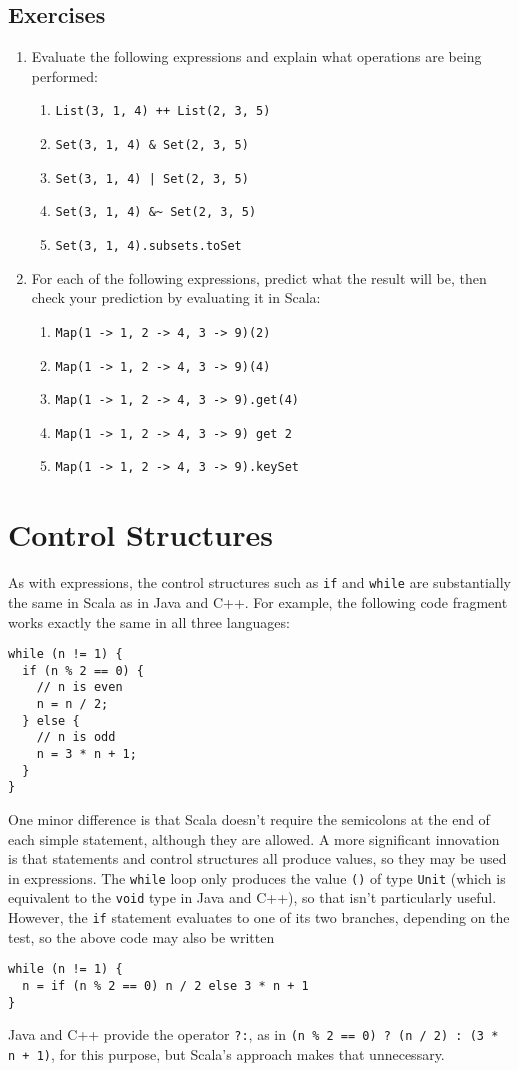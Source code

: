\documentclass[11pt]{article}
\begin{document}
\subsection*{Exercises}
\begin{enumerate}
\item Evaluate the following expressions and explain what operations are being performed:
\begin{enumerate}
\item \verb|List(3, 1, 4) ++ List(2, 3, 5)|
\item \verb|Set(3, 1, 4) & Set(2, 3, 5)|
\item \verb-Set(3, 1, 4) | Set(2, 3, 5)-
\item \verb|Set(3, 1, 4) &~ Set(2, 3, 5)|
\item \verb|Set(3, 1, 4).subsets.toSet|
\end{enumerate}

\item For each of the following expressions, predict what the result will be, then check your prediction by evaluating it in Scala:
\begin{enumerate}
\item \verb|Map(1 -> 1, 2 -> 4, 3 -> 9)(2)|
\item \verb|Map(1 -> 1, 2 -> 4, 3 -> 9)(4)|
\item \verb|Map(1 -> 1, 2 -> 4, 3 -> 9).get(4)|
\item \verb|Map(1 -> 1, 2 -> 4, 3 -> 9) get 2|
\item \verb|Map(1 -> 1, 2 -> 4, 3 -> 9).keySet|
\end{enumerate}

\end{enumerate}

\section{Control Structures}
As with expressions, the control structures such as \texttt{if} and \texttt{while} are substantially the same in Scala as in Java and C++. For example, the following code fragment works exactly the same in all three languages:
\begin{verbatim}
while (n != 1) {
  if (n % 2 == 0) {
    // n is even
    n = n / 2;
  } else {
    // n is odd
    n = 3 * n + 1;
  }
}
\end{verbatim}
One minor difference is that Scala doesn't require the semicolons at the end of each simple statement, although they are allowed. A more significant innovation is that statements and control structures all produce values, so they may be used in expressions. The \texttt{while} loop only produces the value \texttt{()} of type \texttt{Unit} (which is equivalent to the \texttt{void} type in Java and C++), so that isn't particularly useful. However, the \texttt{if} statement evaluates to one of its two branches, depending on the test, so the above code may also be written
\begin{verbatim}
while (n != 1) {
  n = if (n % 2 == 0) n / 2 else 3 * n + 1
}
\end{verbatim}
Java and C++ provide the operator \texttt{?:}, as in \verb|(n % 2 == 0) ? (n / 2) : (3 * n + 1)|, for this purpose, but Scala's approach makes that unnecessary.
\end{document}
